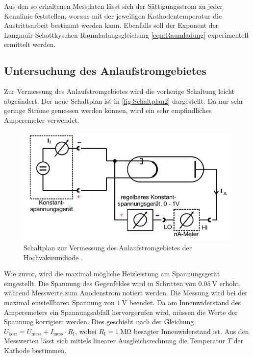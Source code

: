 Aus den so erhaltenen Messdaten lässt sich der Sättigungsstrom zu jeder Kennlinie feststellen, woraus mit der jeweiligen Kathodentemperatur die Austrittsarbeit bestimmt werden kann.
Ebenfalls soll der Exponent der Langmuir-Schottkyschen Raumladungsgleichung \eqref{eqn:Raumladung} experimentell ermittelt werden.

\subsection{Untersuchung des Anlaufstromgebietes}
\label{subsec:D_Anlaufstrom}
Zur Vermessung des Anlaufstromgebietes wird die vorherige Schaltung leicht abgeändert. Der neue Schaltplan ist in \autoref{fig:Schaltplan2} dargestellt. 
Da nur sehr geringe Ströme gemessen werden können, wird ein sehr empfindliches Amperemeter verwendet.

\begin{figure}
    \centering
    \includegraphics[width = .6\textwidth]{content/Schaltplan2.png}
    \caption{Schaltplan zur Vermessung des Anlaufstromgebietes der Hochvakuumdiode \cite{v504}.}
    \label{fig:Schaltplan2}
\end{figure}

Wie zuvor, wird die maximal mögliche Heizleistung am Spannungsgerät eingestellt. Die Spannung des Gegenfeldes wird in Schritten von $\qty{0.05}{\volt}$ erhöht, während Messwerte
zum Anodenstrom notiert werden. Die Messung wird bei der maximal einstellbaren Spannung von $\qty{1}{\volt}$ beendet.
Da am Innenwiderstand des Amperemeters ein Spannungsabfall hervorgerufen wird, müssen die Werte der Spannung korrigiert werden. 
Dies geschieht nach der Gleichung $U_\text{korr} = U_\text{mess} + I_\text{mess} \cdot R_\text{I}$, wobei $R_\text{I} = \qty{1}{\mega\ohm}$ besagter Innenwiderstand ist.
Aus den Messwerten lässt sich mittels linearer Ausgleichsrechnung die Temperatur $T$ der Kathode bestimmen. 
